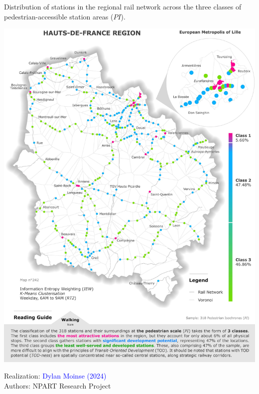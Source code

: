\begin{refsegment}
\begin{carte}[h!]\vspace*{4pt}
    \caption{Distribution of stations in the regional rail network across the three classes of pedestrian-accessible station areas (\(PI\)).}
    \label{fig-chap6:classification-gares-pieton}
    \centerline{\includegraphics[width=1\columnwidth]{src/Figures/Chap-6/EN_NPART_Carte_Classification_PI.jpg}}
    \vspace{5pt}
    \begin{flushright}\scriptsize{
    Realization: \textcolor{blue}{Dylan Moinse (2024)}
    \\
    Authors: \acrshort{NPART} Research Project
    }\end{flushright}
\end{carte}


\end{refsegment}
